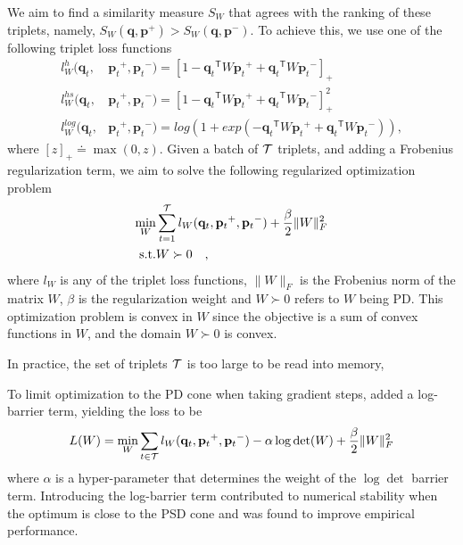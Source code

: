\documentclass[twoside,11pt]{article}
\newcommand\mat[1]{{#1}}
\renewcommand\vec[1]{\mathbf{#1}}
\newcommand{\T}{{}^\mathsf{T}}
\newcommand{\W}{\mat{W}}
\newcommand{\eqdef}{\doteq}
\newcommand{\frobsq}[1]{{\|#1\|_F^2}}
\newcommand{\frob}[1]{{\|#1\|_F}}
\newcommand{\ignore}[1]{}
\newcommand{\q}{{\vec{q}}}
\newcommand{\p}{{\vec{p}}}
\newcommand{\trip}{{t}}
\newcommand{\qt}{{\q_{\trip}}}
\newcommand{\pt}{{\p_{\trip}}}
\begin{document}
We aim to find a similarity measure $S_{\W}$ that agrees with the ranking of these triplets, namely, $S_{\W}(\q, \p^{+}) > S_{\W}(\q,
\p^{-})$. To achieve this, we use one of the following triplet loss functions
\begin{align}
\label{single-triplet-lossed}
l_{\W}^h(\qt, &\pt^{+}, \pt^{-}) = [1-\qt\T\W\pt^+ + \qt\T\W\pt^-]_{+}
 \\ \nonumber
l_{\W}^{hs}(\qt, &\pt^+, \pt^-) = [1-\qt\T\W\pt^+ + \qt\T\W\pt^-]_{+}^2
 \\ \nonumber
l_{\W}^{log}(\qt, &\pt^+, \pt^-) = log(1+exp(-\qt\T\W\pt^+ + \qt\T\W\pt^-)) \nonumber ,
\end{align}
where $[z]_{+} \eqdef \max(0,z)$. Given a batch of $\cal{T}$ triplets, and adding a Frobenius regularization term, we aim to solve the following regularized optimization problem
\begin{eqnarray}
  \min_{\W}& \sum_{\trip=1}^{\cal{T}}  l_{\W}(\qt, \pt^+, \pt^-) + \frac{\beta}{2} \frobsq{\W}
 \\  \nonumber
   \rm{s.t.}& \W \succ 0 \quad,
\label{hingelt}
\end{eqnarray}
where $l_{\W}$ is any of the triplet loss functions, $\frob{\W}$ is the Frobenius norm of the matrix $\W$, $\beta$ is the regularization weight and $\W \succ 0$ refers to $\W$ being PD. This optimization problem is convex in $\W$ since the objective is a sum of convex functions in $\W$, and the domain $\W \succ 0$ is convex.

In practice, the set of triplets $\cal{T}$ is too large to be read into memory, 

\ignore{
Previous metric learning approaches \citep{OASIS, qianHD, qian}, solved the constrained optimization problem by SGD or stochastic mini-batch gradient steps, while repeatedly projecting back to the convex cone of PD matrices. This projection amounts to solving an eigendecomposition problem and is therefore costly in runtime. An alternative approach is to use a log-barrier term and avoid projecting onto the PD cone \citep{davis2007information,lego}, yielding}

To limit optimization to the PD cone when taking gradient steps, 
\citet{davis2007information,lego} added a log-barrier term, yielding the loss to be 
\begin{equation}
\label{eq-logdet-loss}
L(W) = 
  \min_{\W} \sum_{\trip \in \cal{T}}  l_{\W}(\qt, \pt^+, \pt^-) - \alpha \log \det(\W) + \frac{\beta}{2} \frobsq{\W}
\end{equation}
where $\alpha$ is a hyper-parameter that determines the weight of the $\log \det$ barrier term. Introducing the log-barrier term contributed to numerical stability when the optimum is close to the PSD cone and was found to improve empirical performance.
\end{document}
